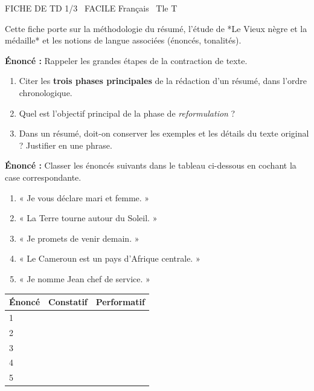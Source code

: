\documentclass[11pt]{article}
\begin{document}
\begin{tcolorbox}[enhanced,colback=popink,colframe=popink,arc=10pt,boxrule=0pt,left=12pt,right=12pt,top=9pt,bottom=9pt]
{\color{white}\popxbold\small FICHE DE TD 1/3 \textbullet\ FACILE \hfill Français \textbullet\ Tle T\par}
\end{tcolorbox}
\vspace{4pt}
Cette fiche porte sur la méthodologie du résumé, l'étude de *Le Vieux nègre et la médaille* et les notions de langue associées (énoncés, tonalités).

\begin{exercice}
\textbf{Énoncé :} Rappeler les grandes étapes de la contraction de texte.
\begin{enumerate}
    \item Citer les \textbf{trois phases principales} de la rédaction d'un résumé, dans l'ordre chronologique.
    \item Quel est l'objectif principal de la phase de \textit{reformulation} ?
    \item Dans un résumé, doit-on conserver les exemples et les détails du texte original ? Justifier en une phrase.
\end{enumerate}
\end{exercice}

\begin{exercice}
\textbf{Énoncé :} Classer les énoncés suivants dans le tableau ci-dessous en cochant la case correspondante.
\begin{enumerate}
    \item « Je vous déclare mari et femme. »
    \item « La Terre tourne autour du Soleil. »
    \item « Je promets de venir demain. »
    \item « Le Cameroun est un pays d'Afrique centrale. »
    \item « Je nomme Jean chef de service. »
\end{enumerate}
\begin{center}
\begin{tabular}{|l|c|c|}
\hline
\textbf{Énoncé} & \textbf{Constatif} & \textbf{Performatif} \\
\hline
1 & & \\
\hline
2 & & \\
\hline
3 & & \\
\hline
4 & & \\
\hline
5 & & \\
\hline
\end{tabular}
\end{center}
\end{exercice}
\end{document}
